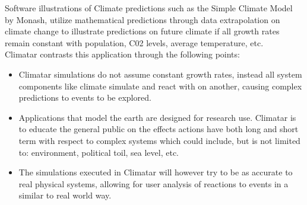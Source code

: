 \documentclass[]{article}
\begin{document}
\begin{itemize}
		Software illustrations of Climate predictions such as the Simple Climate Model by Monash, utilize mathematical predictions through data extrapolation on climate change to illustrate predictions on future climate if all growth rates remain constant with population, C02 levels, average temperature, etc\cite{ClimM}.\\
	Climatar contrasts this application through the following points:
		\begin{itemize}
			\item Climatar simulations do not assume constant growth rates, instead all system components like climate simulate and react with on another, causing complex predictions to events to be explored.
			\item Applications that model the earth are designed for  research use. Climatar is to educate the general public on the effects actions have both long and short term with respect to complex systems which could include, but is not limited to: environment, political toil, sea level, etc.
			\item The simulations executed in Climatar will however try to be as accurate to real physical systems, allowing for user analysis of reactions to events in a similar to real world way.
		\end{itemize}	 


\end{itemize}
\end{document}
